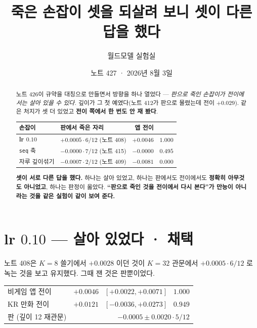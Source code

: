 \documentclass[11pt]{article}
\begin{document}
\title{죽은 손잡이 셋을 되살려 보니 셋이 다른 답을 했다}
\author{월드모델 실험실}
\date{노트 427 · 2026년 8월 3일}
\maketitle

\begin{abstract}
노트 426이 규약을 대칭으로 만들면서 방향을 하나 열었다 --- \emph{판으로
죽인 손잡이가 전이에서는 살아 있을 수 있다.} 깊이가 그 첫 예였다(노트 412가
판으로 물렸는데 전이 $+0.029$). 같은 처지가 셋 더 있었고 \textbf{전이 쪽에서
한 번도 안 재 봤다}.

\begin{center}
\begin{tabular}{llrl}
\hline
손잡이 & 판에서 죽은 자리 & 앱 전이 & \\
\hline
\textbf{lr $0.10$} & $+0.0005 \cdot 6/12$ (노트 408) & $\mathbf{+0.0046}$ & $1.000$ \\
\texttt{seq} 축 & $\mathbf{-0.0000} \cdot 7/12$ (노트 415) & $\mathbf{-0.0000}$ & $0.495$ \\
자루 깊이섞기 & $-0.0007 \cdot 2/12$ (노트 409) & $\mathbf{-0.0081}$ & $0.000$ \\
\hline
\end{tabular}
\end{center}

\textbf{셋이 서로 다른 답을 했다.} 하나는 살아 있었고, 하나는 판에서도
전이에서도 \textbf{정확히 아무것도 아니었고}, 하나는 판정이 옳았다.
\textbf{``판으로 죽인 것을 전이에서 다시 본다''가 만능이 아니라는 것을
같은 실험이 같이 보여 준다.}
\end{abstract}

\section{lr $0.10$ --- 살아 있었다 · 채택}

노트 408은 $K{=}8$ 쓸기에서 $+0.0028$ 이던 것이 $K{=}32$ 관문에서
$+0.0005 \cdot 6/12$ 로 녹는 것을 보고 유지했다. 그때 잰 것은 판뿐이었다.

\begin{center}
\begin{tabular}{lr}
\hline
비게임 앱 전이 & $+0.0046$ \ $[+0.0022, +0.0071]$ \ $1.000$ \\
KR 만화 전이 & $+0.0121$ \ $[-0.0036, +0.0273]$ \ $0.949$ \\
판 (깊이 12 재관문) & $-0.0005 \pm 0.0020 \cdot 5/12$ \\
\hline
\end{tabular}
\end{center}
\end{document}
